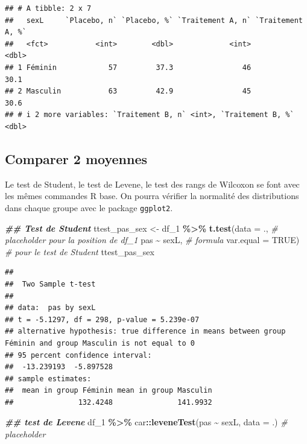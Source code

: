 \documentclass[
]{book}
\newenvironment{Shaded}{\begin{snugshade}}{\end{snugshade}}
\newcommand{\AttributeTok}[1]{\textcolor[rgb]{0.13,0.29,0.53}{#1}}
\newcommand{\CommentTok}[1]{\textcolor[rgb]{0.56,0.35,0.01}{\textit{#1}}}
\newcommand{\ConstantTok}[1]{\textcolor[rgb]{0.56,0.35,0.01}{#1}}
\newcommand{\DocumentationTok}[1]{\textcolor[rgb]{0.56,0.35,0.01}{\textbf{\textit{#1}}}}
\newcommand{\FunctionTok}[1]{\textcolor[rgb]{0.13,0.29,0.53}{\textbf{#1}}}
\newcommand{\NormalTok}[1]{#1}
\newcommand{\OtherTok}[1]{\textcolor[rgb]{0.56,0.35,0.01}{#1}}
\newcommand{\SpecialCharTok}[1]{\textcolor[rgb]{0.81,0.36,0.00}{\textbf{#1}}}
\begin{document}
\begin{verbatim}
## # A tibble: 2 x 7
##   sexL     `Placebo, n` `Placebo, %` `Traitement A, n` `Traitement A, %`
##   <fct>           <int>        <dbl>             <int>             <dbl>
## 1 Féminin            57         37.3                46              30.1
## 2 Masculin           63         42.9                45              30.6
## # i 2 more variables: `Traitement B, n` <int>, `Traitement B, %` <dbl>
\end{verbatim}

\subsection{Comparer 2 moyennes}\label{comparer-2-moyennes-1}

Le test de Student, le test de Levene, le test des rangs de Wilcoxon se font avec les mêmes commandes R base. On pourra vérifier la normalité des distributions dans chaque groupe avec le package \texttt{ggplot2}.

\begin{Shaded}
\begin{Highlighting}[]
\DocumentationTok{\#\# Test de Student}
\NormalTok{ttest\_pas\_sex }\OtherTok{\textless{}{-}}\NormalTok{ df\_1 }\SpecialCharTok{\%\textgreater{}\%} \FunctionTok{t.test}\NormalTok{(}\AttributeTok{data =}\NormalTok{ ., }\CommentTok{\# placeholder pour la position de df\_1}
\NormalTok{                                 pas }\SpecialCharTok{\textasciitilde{}}\NormalTok{ sexL, }\CommentTok{\# formula}
                                 \AttributeTok{var.equal =} \ConstantTok{TRUE}\NormalTok{) }\CommentTok{\# pour le test de Student}
\NormalTok{ttest\_pas\_sex}
\end{Highlighting}
\end{Shaded}

\begin{verbatim}
## 
##  Two Sample t-test
## 
## data:  pas by sexL
## t = -5.1297, df = 298, p-value = 5.239e-07
## alternative hypothesis: true difference in means between group Féminin and group Masculin is not equal to 0
## 95 percent confidence interval:
##  -13.239193  -5.897528
## sample estimates:
##  mean in group Féminin mean in group Masculin 
##               132.4248               141.9932
\end{verbatim}

\begin{Shaded}
\begin{Highlighting}[]
\DocumentationTok{\#\# test de Levene}
\NormalTok{df\_1 }\SpecialCharTok{\%\textgreater{}\%}\NormalTok{ car}\SpecialCharTok{::}\FunctionTok{leveneTest}\NormalTok{(pas }\SpecialCharTok{\textasciitilde{}}\NormalTok{ sexL,}
                         \AttributeTok{data =}\NormalTok{ .) }\CommentTok{\# placeholder}
\end{Highlighting}
\end{Shaded}
\end{document}
